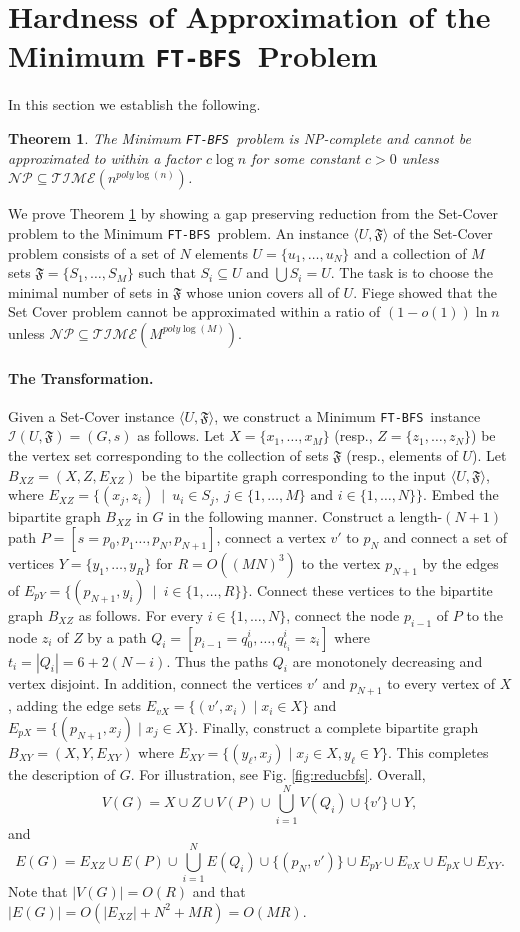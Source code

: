 \documentclass[12pt]{article}
\newtheorem{theorem}{Theorem}[section]
\def\Set{\mathfrak{F}}
\def\FTBFS{\mbox{\tt FT-BFS}}
\begin{document}
\section{Hardness of Approximation of the Minimum \FTBFS\ Problem}
\label{sec:hardness}
In this section we establish the following.
\begin{theorem}
\label{thm:hardness}
The Minimum \FTBFS\ problem is NP-complete and cannot be approximated to within a factor $c \log n$ for some constant $c>0$ unless $\mathcal{NP} \subseteq  \mathcal{TIME}(n^{poly\log(n)})$.
\end{theorem}
We prove Theorem \ref{thm:hardness} by showing a gap preserving reduction
from the Set-Cover problem to the Minimum \FTBFS\ problem.
An instance $\langle U, \Set \rangle$ of the Set-Cover problem consists of
a set of $N$ elements $U=\{u_1, \ldots, u_N\}$ and
a collection of $M$ sets $\Set=\{S_1, \ldots, S_M\}$
such that $S_i \subseteq U$ and $\bigcup S_i=U$.
The task is to choose the minimal number of sets
in $\Set$ whose union covers all of $U$.
Fiege \cite{Feige98} showed that the Set Cover problem cannot be approximated
within a ratio of $(1-o(1)) \ln n$ unless $\mathcal{NP} \subseteq  \mathcal{TIME}(M^{poly\log(M)})$.

\paragraph{The Transformation.}
Given a Set-Cover instance $\langle U, \Set \rangle$,
we construct a Minimum \FTBFS\ instance $\mathcal{I}(U, \Set)=(G,s)$
as follows. Let $X=\{x_1, \ldots, x_M\}$ (resp.,  $Z=\{z_1, \ldots, z_N\}$)
be the vertex set corresponding to the collection of sets $\Set$
(resp., elements of $U$). Let $B_{XZ}=(X, Z, E_{XZ})$ be the bipartite
graph corresponding to the input $\langle U, \Set \rangle$, where
$E_{XZ}=\{(x_j, z_i) ~\mid ~u_i \in S_j,~ j \in \{1, \ldots ,M\} \mbox{~and~} i \in \{1, \ldots, N\}\}$.
Embed the bipartite graph $B_{XZ}$ in $G$ in the following manner.
Construct a length-$(N+1)$ path $P=[s=p_0, p_1 \ldots, p_N, p_{N+1}]$,
connect a vertex $v'$ to $p_{N}$ and connect a set of vertices $Y=\{y_1, \ldots, y_R\}$ for  $R=O((M N)^3)$ to the vertex $p_{N+1}$ by the edges of $E_{pY}=\{(p_{N+1},y_i) ~\mid~ i\in \{1, \ldots, R\}\}$.
Connect these vertices to the bipartite graph $B_{XZ}$ as follows.
For every $i\in \{1, \ldots, N\}$, connect the node $p_{i-1}$ of $P$ to the node $z_i$ of $Z$ by a path $Q_i=[p_{i-1}=q^i_0, \ldots, q^i_{t_i}=z_i]$ where $t_i=|Q_i|=6+2(N-i)$.
Thus the paths $Q_i$ are monotonely decreasing and vertex disjoint.
In addition, connect the vertices $v'$ and $p_{N+1}$ to every vertex of $X$, adding the edge sets $E_{vX}=\{(v', x_i) \mid x_i \in X\}$ and $E_{pX}=\{(p_{N+1}, x_j) \mid x_j \in X\}$.
Finally, construct a complete bipartite graph $B_{XY}=(X, Y, E_{XY})$ where
$E_{XY}=\{(y_\ell, x_j) \mid x_j \in X, y_\ell \in Y\}$.
This completes the description of $G$. For illustration, see
Fig. \ref{fig:reducbfs}.
Overall,
$$V(G)=X \cup Z \cup V(P) \cup \bigcup_{i=1}^N V(Q_i) \cup \{v'\} \cup Y,$$
and
$$E(G)=E_{XZ} \cup E(P) \cup \bigcup_{i=1}^N E(Q_i) \cup \{(p_{N}, v')\} \cup E_{pY} \cup E_{vX} \cup E_{pX} \cup E_{XY}.$$
Note that $|V(G)|=O(R)$ and that $|E(G)|=O(|E_{XZ}|+N^2+M R)=O(M R)$.
\end{document}
